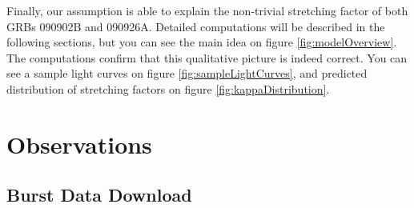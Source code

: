 \documentclass{article}
\begin{document}
	Finally, our assumption is able to explain the non-trivial stretching factor of both GRBs 090902B and 090926A.
	Detailed computations will be described in the following sections, but you can see the main idea on figure \ref{fig:modelOverview}.
	The computations confirm that this qualitative picture is indeed correct.
	You can see a sample light curves on figure \ref{fig:sampleLightCurves}, and predicted distribution of stretching factors on figure \ref{fig:kappaDistribution}.

\section{Observations}
\label{sec:observations}

\subsection{Burst Data Download}
\end{document}
